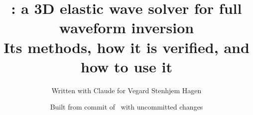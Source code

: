 \documentclass[a4paper,11pt]{article}
\title{\vr: a 3D elastic wave solver for full waveform inversion\\[0.4em]
  \large Its methods, how it is verified, and how to use it}
\author{Written with Claude for Vegard Stenhjem Hagen}
\date{Built from commit \commit{\buildcommit} of \builddate
  \ifbuilddirty\ \textcolor{vrred}{with uncommitted changes}\fi}
\begin{document}
\maketitle

\begin{abstract}

\end{abstract}

\tableofcontents
\newpage








\appendix




\end{document}
